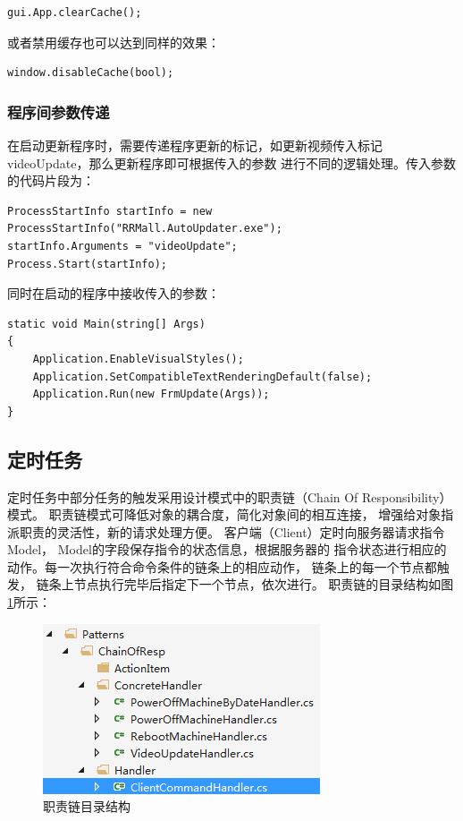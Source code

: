 \documentclass{book}
\begin{document}
\begin{lstlisting}
gui.App.clearCache();
\end{lstlisting}
或者禁用缓存也可以达到同样的效果：
\begin{lstlisting}
window.disableCache(bool);
\end{lstlisting}

\subsubsection{程序间参数传递}

在启动更新程序时，需要传递程序更新的标记，如更新视频传入标记videoUpdate，那么更新程序即可根据传入的参数
进行不同的逻辑处理。传入参数的代码片段为：
\begin{lstlisting}
ProcessStartInfo startInfo = new ProcessStartInfo("RRMall.AutoUpdater.exe");
startInfo.Arguments = "videoUpdate";
Process.Start(startInfo);
\end{lstlisting}

同时在启动的程序中接收传入的参数：
\begin{lstlisting}
static void Main(string[] Args)
{  
    Application.EnableVisualStyles();
    Application.SetCompatibleTextRenderingDefault(false);
    Application.Run(new FrmUpdate(Args));    
}
\end{lstlisting}

\subsection{定时任务}

定时任务中部分任务的触发采用设计模式中的职责链（Chain Of Responsibility）模式。
职责链模式可降低对象的耦合度，简化对象间的相互连接，
增强给对象指派职责的灵活性，新的请求处理方便。
客户端（Client）定时向服务器请求指令Model，
Model的字段保存指令的状态信息，根据服务器的
指令状态进行相应的动作。每一次执行符合命令条件的链条上的相应动作，
链条上的每一个节点都触发，
链条上节点执行完毕后指定下一个节点，依次进行。
职责链的目录结构如图\ref{fig:ChainOfResponsibilityContentStructure}所示：

\begin{figure}[htbp]
	\centering
	\includegraphics[scale=1]{ChainOfResponsibilityContentStructure.png}
	\caption{职责链目录结构}
	\label{fig:ChainOfResponsibilityContentStructure}
\end{figure}
\end{document}
